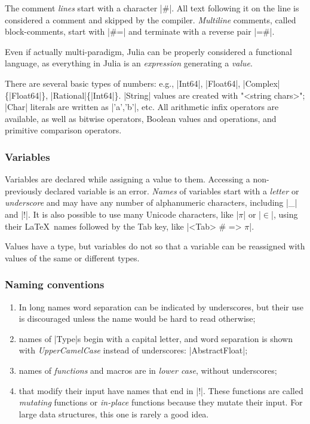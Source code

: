 The comment \emph{lines} start with a character |#|. All text following it on the line is considered a comment and skipped by the compiler.  \emph{Multiline} comments, called block-comments, start with |#=| and terminate with a reverse pair |=#|.

Even if actually multi-paradigm, Julia can be properly considered a functional language, as everything in Julia is an \emph{expression} generating a \emph{value}. 

There are several basic types of numbers: e.g.,
|Int64|, |Float64|, |Complex|\{|Float64|\}, |Rational|\{|Int64|\}. |String| values are created with  "<string chars>"; |Char| literals are written as |'a','b'|, etc. All arithmetic infix operators are available, as well as bitwise operators, Boolean values and operations, and primitive comparison operators. 

\subsubsection*{Variables}

Variables are declared while assigning a value to them. Accessing a non-previously declared variable is an error. \emph{Names} of variables start with a \emph{letter} or \emph{underscore} and may have any number of alphanumeric characters, including |_| and |!|. It is also possible to use many Unicode characters, like |$\pi$| or |$\in$|, using their \LaTeX\ names 
followed by the Tab key, like |\pi<Tab> # => $\pi$|. 

Values have a type, but variables do not so that a variable can be reassigned with values of the same or different types.

\subsubsection*{Naming conventions}
\begin{enumerate}
\item 
In {long names} word {separation} can be indicated by underscores, but their use is discouraged unless the name would be hard to read otherwise;

\item 
names of |Type|s begin with a capital letter, and word separation is shown with \emph{UpperCamelCase} instead of underscores: |AbstractFloat|;

\item 
names of \emph{functions} and macros are in \emph{lower case}, without underscores;

\item 
{} that modify their input have names that end in |!|. These functions are called \emph{mutating} functions or \emph{in-place} functions because they mutate their input.  For large data structures, this one is rarely a good idea.
\end{enumerate}

